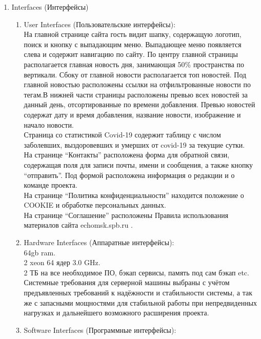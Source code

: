 \begin{enumerate}
\begin{enumerate}[label=3.\arabic*]
        \item Interfaces (Интерфейсы)
        \BgThispage
        \begin{enumerate}[label=3.6.\arabic*]
            \item User Interfaces (Пользовательские интерфейсы): \\
            На главной странице сайта гость видит шапку, содержащую логотип, поиск и кнопку с выпадающим меню.
            Выпадающее меню появляется слева и содержит навигацию по сайту. По центру главной страницы
            располагается главная новость дня, занимающая 50\% пространства по вертикали. Сбоку от главной
            новости располагается топ новостей. Под главной новостью расположены ссылки на отфильтрованные
            новости по тегам.В нижней части страницы расположены превью всех новостей за данный день, отсортированные
            по времени добавления. Превью новостей содержат дату и время добавления, название новости, изображение и начало новости. \\
            Страница со статистикой Covid-19 содержит таблицу с числом заболевших, выздоровевших и умерших от covid-19 за текущие сутки. \\
            На странице ``Контакты'' расположена форма для обратной связи, содержащая поля для записи почты, имени и сообщения, а также кнопку ``отправить''. Под формой расположена информация о редакции и о команде проекта. \\
            На странице ``Политика конфиденциальности'' находится положение о COOKIE и обработке персональных данных. \\
            На странице ``Соглашение'' расположены Правила использования материалов сайта echomsk.spb.ru .
            \item Hardware Interfaces (Аппаратные интерфейсы): \\
            64gb ram. \\
            2 xeon 64 ядер 3.0 GHz. \\
            2 ТБ на все необходимое ПО, бэкап сервисы, память под сам бэкап etc. \\
            Системные требования для серверной машины выбраны с учётом предъявленных требований к надёжности и стабильности системы,
            а так же с запасными мощностями для стабильной работы при непредвиденных нагрузках и дальнейшего возможного расширения проекта.
            \item Software Interfaces (Программные интерфейсы): \\

\end{enumerate}
\end{enumerate}
\end{enumerate}
